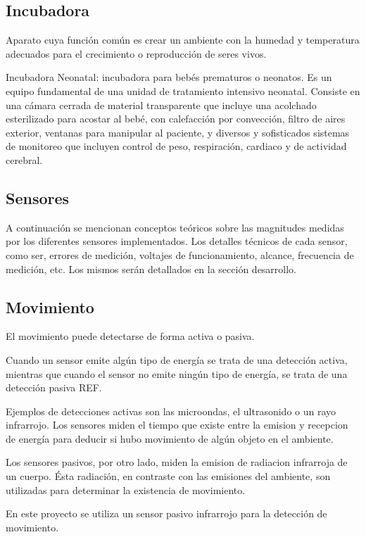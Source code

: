 \documentclass{IEEEtran}
\begin{document}
		\subsection{Incubadora}
			Aparato cuya función común es crear un ambiente con la humedad y temperatura adecuados para el crecimiento o reproducción de seres vivos.

			Incubadora Neonatal: incubadora para bebés prematuros o neonatos. Es un equipo fundamental de una unidad de tratamiento intensivo neonatal. Consiste en una cámara cerrada de material transparente que incluye una acolchado esterilizado para acostar al bebé, con calefacción por convección, filtro de aires exterior, ventanas para manipular al paciente, y diversos y sofisticados sistemas de monitoreo que incluyen control de peso, respiración, cardiaco y de actividad cerebral.

		\subsection{Sensores}

			A continuación se mencionan conceptos teóricos sobre las magnitudes medidas por los diferentes sensores implementados. Los detalles técnicos de cada sensor, como ser, errores de medición, voltajes de funcionamiento, alcance, frecuencia de medición, etc. Los mismos serán detallados en la sección desarrollo.

		\subsection{Movimiento}

			El movimiento puede detectarse de forma activa o pasiva.

			Cuando un sensor emite algún tipo de energía se trata de una detección activa, mientras que cuando el sensor no emite ningún tipo de energía, se trata de una detección pasiva REF.

			Ejemplos de detecciones activas son las microondas, el ultrasonido o un rayo infrarrojo. Los sensores miden el tiempo que existe entre la emision y recepcion de energía para deducir si hubo movimiento de algún objeto en el ambiente.

			Los sensores pasivos, por otro lado, miden la emision de radiacion infrarroja de un cuerpo. Ésta radiación, en contraste con las emisiones del ambiente, son utilizadas para determinar la existencia de movimiento.

			En este proyecto se utiliza un sensor pasivo infrarrojo para la detección de movimiento.
\end{document}
